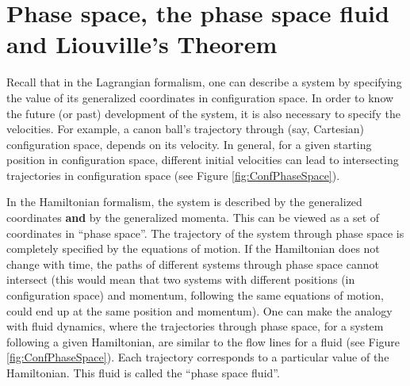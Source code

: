 \section{Phase space, the phase space fluid and Liouville's Theorem}
Recall that in the Lagrangian formalism, one can describe a system by specifying the value of its generalized coordinates in configuration space. In order to know the future (or past) development of the system, it is also necessary to specify the velocities. For example, a canon ball's trajectory through (say, Cartesian) configuration space, depends on its velocity. In general, for a given starting position in configuration space, different initial velocities can lead to intersecting trajectories in configuration space (see Figure \ref{fig:ConfPhaseSpace}).

In the Hamiltonian formalism, the system is described by the generalized coordinates \textbf{and} by the generalized momenta. This can be viewed as a set of coordinates in ``phase space''. The trajectory of the system through phase space is completely specified by the equations of motion. If the Hamiltonian does not change with time, the paths of different systems through phase space cannot intersect (this would mean that two systems with different positions (in configuration space) and momentum, following the same equations of motion, could end up at the same position and momentum). One can make the analogy with fluid dynamics, where the trajectories through phase space, for a system following a given Hamiltonian, are similar to the flow lines for a fluid (see Figure \ref{fig:ConfPhaseSpace}). Each trajectory corresponds to a particular value of the Hamiltonian. This fluid is called the ``phase space fluid''.


